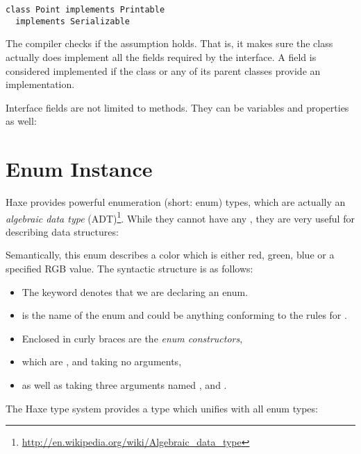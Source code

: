 {\begin{lstlisting}
class Point implements Printable
  implements Serializable
\end{lstlisting}

The compiler checks if the  assumption holds. That is, it makes sure the class actually does implement all the fields required by the interface. A field is considered implemented if the class or any of its parent classes provide an implementation.

Interface fields are not limited to methods. They can be variables and properties as well:




\section{Enum Instance}
\label{types-enum-instance}

Haxe provides powerful enumeration (short: enum) types, which are actually an \emph{algebraic data type} (ADT)\footnote{\url{http://en.wikipedia.org/wiki/Algebraic_data_type}}. While they cannot have any , they are very useful for describing data structures:

Semantically, this enum describes a color which is either red, green, blue or a specified RGB value. The syntactic structure is as follows:
\begin{itemize}
	\item The keyword  denotes that we are declaring an enum.
	\item {} is the name of the enum and could be anything conforming to the rules for .
	\item Enclosed in curly braces \expr{$\left\{\right\}$} are the \emph{enum constructors},
	\item which are ,  and  taking no arguments,
	\item as well as  taking three  arguments named ,  and .
\end{itemize}
The Haxe type system provides a type which unifies with all enum types:

}
